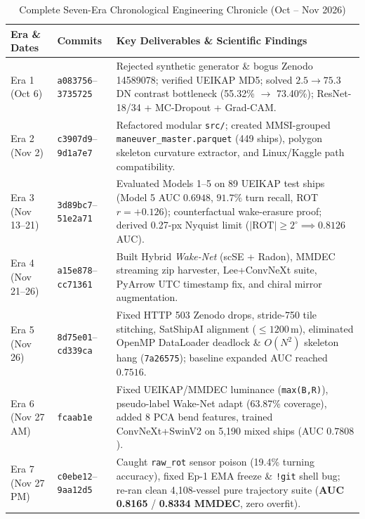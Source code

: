 \documentclass[11pt,a4paper]{article}
\begin{document}
\begin{table}[H]
\centering
\caption{Complete Seven-Era Chronological Engineering Chronicle (Oct -- Nov 2026)}
\label{tab:chronicle}
{\small
\begin{tabularx}{\textwidth}{|l|l|X|}
\hline
\rowcolor{ruetgray}
\textbf{Era \& Dates} & \textbf{Commits} & \textbf{Key Deliverables \& Scientific Findings} \\ \hline
Era 1 (Oct 6) & \texttt{a083756}--\texttt{3735725} & Rejected synthetic generator \& bogus Zenodo 14589078; verified UEIKAP MD5; solved $2.5\rightarrow 75.3$\,DN contrast bottleneck (55.32\% $\rightarrow$ 73.40\%); ResNet-18/34 + MC-Dropout + Grad-CAM. \\ \hline
Era 2 (Nov 2) & \texttt{c3907d9}--\texttt{9d1a7e7} & Refactored modular \texttt{src/}; created MMSI-grouped \texttt{maneuver\_master.parquet} (449 ships), polygon skeleton curvature extractor, and Linux/Kaggle path compatibility. \\ \hline
Era 3 (Nov 13--21) & \texttt{3d89bc7}--\texttt{51e2a71} & Evaluated Models 1--5 on 89 UEIKAP test ships (Model 5 AUC $0.6948$, $91.7\%$ turn recall, ROT $r=+0.126$); counterfactual wake-erasure proof; derived 0.27-px Nyquist limit ($|\text{ROT}|\ge 2^\circ\implies 0.8126$ AUC). \\ \hline
Era 4 (Nov 21--26) & \texttt{a15e878}--\texttt{cc71361} & Built Hybrid \textit{Wake-Net} (scSE + Radon), MMDEC streaming zip harvester, Lee+ConvNeXt suite, PyArrow UTC timestamp fix, and chiral mirror augmentation. \\ \hline
Era 5 (Nov 26) & \texttt{8d75e01}--\texttt{cd339ca} & Fixed HTTP 503 Zenodo drops, stride-750 tile stitching, SatShipAI alignment ($\le 1200$\,m), eliminated OpenMP DataLoader deadlock \& $O(N^2)$ skeleton hang (\texttt{7a26575}); baseline expanded AUC reached $0.7516$. \\ \hline
Era 6 (Nov 27 AM) & \texttt{fcaab1e} & Fixed UEIKAP/MMDEC luminance (\texttt{max(B,R)}), pseudo-label Wake-Net adapt (63.87\% coverage), added 8 PCA bend features, trained ConvNeXt+SwinV2 on 5,190 mixed ships (AUC $0.7808$). \\ \hline
Era 7 (Nov 27 PM) & \texttt{c0ebe12}--\texttt{9aa12d5} & Caught \texttt{raw\_rot} sensor poison (19.4\% turning accuracy), fixed Ep-1 EMA freeze \& \texttt{!git} shell bug; re-ran clean 4,108-vessel pure trajectory suite (\textbf{AUC 0.8165} / \textbf{0.8334 MMDEC}, zero overfit). \\ \hline
\end{tabularx}
}
\end{table}
\end{document}
